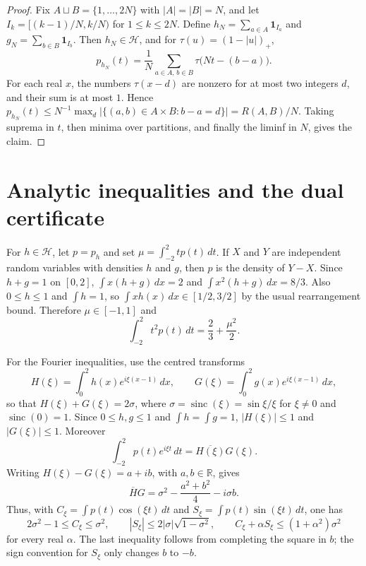 \documentclass[a4paper]{amsart}
\DeclareMathOperator{\sinc}{sinc}
\newcommand{\R}{\mathbb R}
\newcommand{\dd}{\,d}
\newcommand{\one}{\mathbf 1}
\begin{document}
\begin{proof}
Fix $A\sqcup B=\{1,\ldots,2N\}$ with $|A|=|B|=N$, and let $I_k=[(k-1)/N,k/N)$ for $1\le k\le 2N$.  Define $h_N=\sum_{a\in A}\one_{I_a}$ and $g_N=\sum_{b\in B}\one_{I_b}$.  Then $h_N\in\mathcal H$, and for $\tau(u)=(1-|u|)_+$,
\[
 p_{h_N}(t)=\frac1N\sum_{a\in A,\,b\in B}\tau\bigl(Nt-(b-a)\bigr).
\]
For each real $x$, the numbers $\tau(x-d)$ are nonzero for at most two integers $d$, and their sum is at most $1$.  Hence $p_{h_N}(t)\le N^{-1}\max_d |\{(a,b)\in A\times B:b-a=d\}|=R(A,B)/N$.  Taking suprema in $t$, then minima over partitions, and finally the liminf in $N$, gives the claim.
\end{proof}

\section{Analytic inequalities and the dual certificate}

For $h\in\mathcal H$, let $p=p_h$ and set $\mu=\int_{-2}^2 t p(t)\dd t$.  If $X$ and $Y$ are independent random variables with densities $h$ and $g$, then $p$ is the density of $Y-X$.  Since $h+g=1$ on $[0,2]$, $\int x(h+g)\dd x=2$ and $\int x^2(h+g)\dd x=8/3$.  Also $0\le h\le1$ and $\int h=1$, so $\int xh(x)\dd x\in[1/2,3/2]$ by the usual rearrangement bound.  Therefore $\mu\in[-1,1]$ and
\begin{equation}\label{eq:moment2}
 \int_{-2}^2 t^2p(t)\dd t=\frac23+\frac{\mu^2}{2}.
\end{equation}

For the Fourier inequalities, use the centred transforms
\[
 H(\xi)=\int_0^2 h(x)e^{i\xi(x-1)}\dd x,
 \qquad G(\xi)=\int_0^2 g(x)e^{i\xi(x-1)}\dd x,
\]
so that $H(\xi)+G(\xi)=2\sigma$, where $\sigma=\sinc(\xi)=\sin\xi/\xi$ for $\xi\ne0$ and $\sinc(0)=1$.  Since $0\le h,g\le1$ and $\int h=\int g=1$, $|H(\xi)|\le1$ and $|G(\xi)|\le1$.  Moreover
\[
 \int_{-2}^2 p(t)e^{i\xi t}\dd t=\overline{H(\xi)}G(\xi).
\]
Writing $H(\xi)-G(\xi)=a+ib$, with $a,b\in\R$, gives
\[
 \overline{H}G=\sigma^2-\frac{a^2+b^2}{4}-i\sigma b.
\]
Thus, with $C_\xi=\int p(t)\cos(\xi t)\dd t$ and $S_\xi=\int p(t)\sin(\xi t)\dd t$, one has
\begin{equation}\label{eq:fourier-ineqs}
 2\sigma^2-1\le C_\xi\le\sigma^2,
 \qquad |S_\xi|\le2|\sigma|\sqrt{1-\sigma^2},
 \qquad C_\xi+\alpha S_\xi\le(1+\alpha^2)\sigma^2
\end{equation}
for every real $\alpha$.  The last inequality follows from completing the square in $b$; the sign convention for $S_\xi$ only changes $b$ to $-b$.
\end{document}
